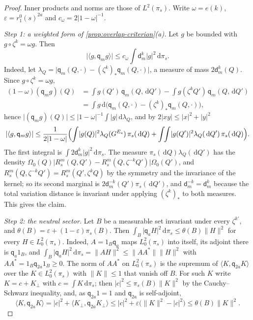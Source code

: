 \documentclass[11pt,a4paper]{amsart}
\theoremstyle{definition}
\theoremstyle{remark}
\numberwithin{equation}{section}
\newcommand{\ip}[2]{\langle #1,#2\rangle}  %
\newcommand{\norm}[1]{\lVert #1\rVert}     %
\newcommand{\abs}[1]{\lvert #1\rvert}      %
\newcommand{\dd}{\,\mathrm{d}}             %
\newcommand{\Omegazero}{\Omega_0}          %
\begin{document}
\begin{proof}
Inner products and norms are those of $L^2(\pi_s)$. Write $\omega=e(k)$, $\varepsilon=r_1^0(s)^{2a}$ and $c_\omega=2\abs{1-\omega}^{-1}$.

\emph{Step 1: a weighted form of \cref{prop:overlap-criterion}(a).} Let $g$ be bounded with $g\circ\zeta^k=\omega g$. Then
\[
\abs{\ip g{\mathsf q_mg}}\le c_\omega\int\mathsf d^k_m\abs g^2\dd\pi_s .
\]
Indeed, let $\lambda_Q=\abs{\mathsf q_m(Q,\cdot)-(\zeta^k)_*\mathsf q_m(Q,\cdot)}$, a measure of mass $2\mathsf d^k_m(Q)$. Since $g\circ\zeta^k=\omega g$,
\begin{align*}
(1-\omega)(\mathsf q_mg)(Q)&=\int g(Q')\,\mathsf q_m(Q,\dd Q')-\int g(\zeta^kQ')\,\mathsf q_m(Q,\dd Q')\\
&=\int g\dd\bigl(\mathsf q_m(Q,\cdot)-(\zeta^k)_*\mathsf q_m(Q,\cdot)\bigr),
\end{align*}
hence $\abs{(\mathsf q_mg)(Q)}\le\abs{1-\omega}^{-1}\int\abs g\dd\lambda_Q$, and by $2\abs{xy}\le\abs x^2+\abs y^2$
\[
\abs{\ip g{\mathsf q_mg}}\le\frac1{2\abs{1-\omega}}\Bigl(\int\abs{g(Q)}^2\lambda_Q(G^{E_s})\,\pi_s(\dd Q)+\int\!\!\int\abs{g(Q')}^2\lambda_Q(\dd Q')\,\pi_s(\dd Q)\Bigr).
\]
The first integral is $\int2\mathsf d^k_m\abs g^2\dd\pi_s$. The measure $\pi_s(\dd Q)\lambda_Q(\dd Q')$ has the density $\Omegazero(Q)\abs{R_s^m(Q,Q')-R_s^m(Q,\zeta^{-k}Q')}\Omegazero(Q')$, and $R_s^m(Q,\zeta^{-k}Q')=R_s^m(Q',\zeta^kQ)$ by the symmetry and the invariance of the kernel; so its second marginal is $2\mathsf d^{-k}_m(Q')\pi_s(\dd Q')$, and $\mathsf d^{-k}_m=\mathsf d^k_m$ because the total variation distance is invariant under applying $(\zeta^k)_*$ to both measures. This gives the claim.

\emph{Step 2: the neutral sector.} Let $B$ be a measurable set invariant under every $\zeta^{k'}$, and $\theta(B)=\varepsilon+(1-\varepsilon)\pi_s(B)$. Then $\int_B\abs{\mathsf q_aH}^2\dd\pi_s\le\theta(B)\norm H^2$ for every $H\in L^2_0(\pi_s)$. Indeed, $A=1_B\mathsf q_a$ maps $L^2_0(\pi_s)$ into itself, its adjoint there is $\mathsf q_a1_B$, and $\int_B\abs{\mathsf q_aH}^2\dd\pi_s=\norm{AH}^2\le\norm{AA^*}\norm H^2$ with $AA^*=1_B\mathsf q_{2a}1_B\ge0$. The norm of $AA^*$ on $L^2_0(\pi_s)$ is the supremum of $\ip K{\mathsf q_{2a}K}$ over the $K\in L^2_0(\pi_s)$ with $\norm K\le1$ that vanish off $B$. For such $K$ write $K=c+K_\perp$ with $c=\int K\dd\pi_s$; then $\abs c^2\le\pi_s(B)\norm K^2$ by the Cauchy--Schwarz inequality, and, as $\mathsf q_{2a}1=1$ and $\mathsf q_{2a}$ is self-adjoint,
\[
\ip K{\mathsf q_{2a}K}=\abs c^2+\ip{K_\perp}{\mathsf q_{2a}K_\perp}\le\abs c^2+\varepsilon\bigl(\norm K^2-\abs c^2\bigr)\le\theta(B)\norm K^2 .
\]


\end{proof}
\end{document}
